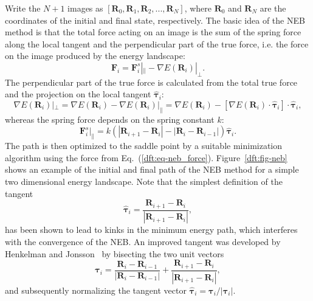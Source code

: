 \begin{refsection}
Write the $N + 1$ images as $\left[ \mathbf{R}_0,  \mathbf{R}_1,  
\mathbf{R}_2, ...,  \mathbf{R}_N  \right]$, where $ \mathbf{R}_0$ and $ 
\mathbf{R}_N$ are the coordinates of the initial and final state, respectively. The basic idea of 
the \gls{NEB} method is that the total force acting on an image is the sum of the 
spring force along the local tangent and the perpendicular part of the true 
force, i.e. the force on the image produced by the energy landscape: 
\begin{equation}\label{dft:eq-neb_force} 
\mathbf{F}_i = \mathbf{F}_i^s|_\parallel - \nabla E(\mathbf{R}_i)|_\perp.
\end{equation} 
The perpendicular part of the true force is calculated from the total true force and the 
projection on the local tangent $\boldsymbol{\hat{\tau}}_i$: 
\begin{equation} 
\nabla E(\mathbf{R}_i)|_\perp = \nabla E(\mathbf{R}_i) - \nabla 
E(\mathbf{R}_i)|_\parallel = \nabla E(\mathbf{R}_i) - \left[ \nabla 
E(\mathbf{R}_i) \cdot \boldsymbol{\hat{\tau}}_i \right] \cdot \boldsymbol{\hat{\tau}}_i, 
\end{equation} 
whereas the spring force depends on the spring constant $k$: 
\begin{equation}\label{dft:eq-neb_spring} 
\mathbf{F}_i^s|_\parallel = k\left( |\mathbf{R}_{i+1} - \mathbf{R}_i | - 
|\mathbf{R}_i - \mathbf{R}_{i-1} | \right) \boldsymbol{\hat{\tau}}_i.
\end{equation}
The path is then optimized to the saddle point by a suitable minimization 
algorithm using the force from Eq.~(\ref{dft:eq-neb_force}). Figure~\ref{dft:fig-neb} 
shows an example of the initial and final path of the \gls{NEB} method for a simple 
two dimensional energy landscape. Note that the simplest definition of the
tangent
\begin{equation}
\boldsymbol{\hat{\tau}}_i = \frac{\mathbf{R}_{i+1} - \mathbf{R}_i}{|\mathbf{R}_{i+1} - \mathbf{R}_i |},
\end{equation}
has been shown to lead to kinks in the minimum energy path, which interferes with the 
convergence of the \gls{NEB}. An improved tangent was developed by 
Henkelman and Jonsson~\cite{Henkelman2000} by bisecting the two unit vectors 
\begin{equation}
\boldsymbol{\tau}_i = \frac{\mathbf{R}_i - \mathbf{R}_{i-1}}{|\mathbf{R}_i - \mathbf{R}_{i-1} |} + \frac{\mathbf{R}_{i+1} - \mathbf{R}_i}{|\mathbf{R}_{i+1} - \mathbf{R}_i |},
\end{equation}
and subsequently normalizing the tangent vector $\boldsymbol{\hat{\tau}}_i = \boldsymbol{\tau}_i / |\boldsymbol{\tau}_i |$.


\end{refsection}
